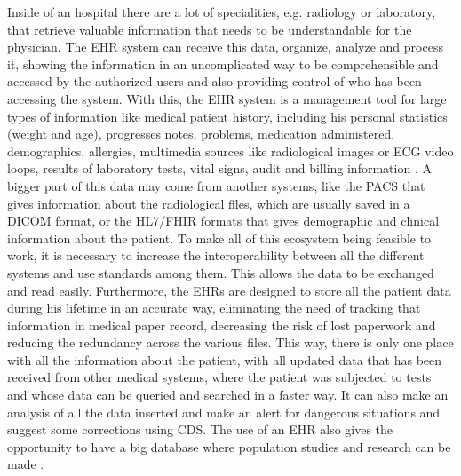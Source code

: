 \documentclass[mim_thesis.tex]{subfiles}
\begin{document}
Inside of an hospital there are a lot of specialities, e.g. radiology or laboratory, that retrieve valuable information that needs to be understandable for the physician. The EHR system can receive this data, organize, analyze and process it, showing the information in an uncomplicated way to be comprehensible and accessed by the authorized users and also providing control of who has been accessing the system. With this, the EHR system is a management tool for large types of information like medical patient history, including his personal statistics (weight and age), progresses notes, problems, medication administered, demographics, allergies, multimedia sources like radiological images or ECG video loops, results of laboratory tests, vital signs, audit and billing information \citep{mcdonald1997barriers}. A bigger part of this data may come from another systems, like the \ac{PACS} that gives information about the radiological files, which are usually saved in a \ac{DICOM} format, or the HL7/FHIR formats that gives demographic and clinical information about the patient. To make all of this ecosystem being feasible to work, it is necessary to increase the interoperability between all the different systems and use standards among them. This allows the data to be exchanged and read easily. 
Furthermore, the EHRs are designed to store all the patient data during his lifetime in an accurate way, eliminating the need of tracking that information in medical paper record, decreasing the risk of lost paperwork and reducing the redundancy across the various files. This way, there is only one place with all the information about the patient, with all updated data that has been received from other medical systems, where the patient was subjected to tests and whose data can be queried and searched in a faster way. It can also make an analysis of all the data inserted and make an alert for dangerous situations and suggest some corrections using \ac{CDS}. The use of an EHR also gives the opportunity to have a big database where population studies and research can be made \citep{dick1997computer}.
\end{document}
